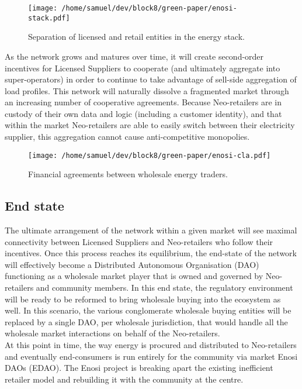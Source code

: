 \documentclass{article}
\theoremstyle{definition}
\theoremstyle{plain} %
\begin{document}
\begin{figure}
\begin{center}
\texttt{[image: /home/samuel/dev/block8/green-paper/enosi-stack.pdf]}
\caption{Separation of licensed and retail entities in the energy stack.}
\end{center}
\end{figure}

\noindent As the network grows and matures over time, it will create second-order incentives for Licensed Suppliers to cooperate (and ultimately aggregate into super-operators) in order to continue to take advantage of sell-side aggregation of load profiles. This network will naturally dissolve a fragmented market through an increasing number of cooperative agreements. Because Neo-retailers are in custody of their own data and logic (including a customer identity), and that within the market Neo-retailers are able to easily switch between their electricity supplier, this aggregation cannot cause anti-competitive monopolies.

\begin{figure}
\begin{center}
\texttt{[image: /home/samuel/dev/block8/green-paper/enosi-cla.pdf]}
\caption{Financial agreements between wholesale energy traders.}	
\end{center}
\end{figure}

\subsection{End state}

The ultimate arrangement of the network within a given market will see maximal connectivity between Licensed Suppliers and Neo-retailers who follow their incentives. Once this process reaches its equilibrium, the end-state of the network will effectively become a Distributed Autonomous Organisation (DAO) functioning as a wholesale market player that is owned and governed by Neo-retailers and community members. In this end state, the regulatory environment will be ready to be reformed to bring wholesale buying into the ecosystem as well. In this scenario, the various conglomerate wholesale buying entities will be replaced by a single DAO, per wholesale jurisdiction, that would handle all the wholesale market interactions on behalf of the Neo-retailers. \\

\noindent At this point in time, the way energy is procured and distributed to Neo-retailers and eventually end-consumers is run entirely for the community via market Enosi DAOs (EDAO). The Enosi project is breaking apart the existing inefficient retailer model and rebuilding it with the community at the centre. 
\end{document}
